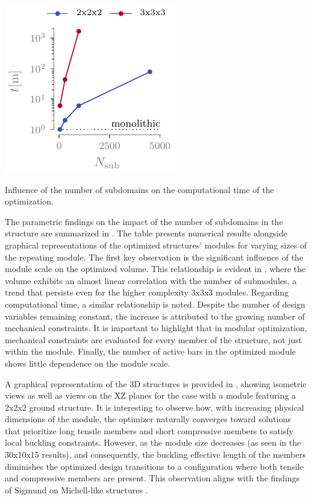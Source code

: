 \begin{marginfigure}
    \centering
    \includegraphics{figures/05_cellular_opt/00_module_scale_tab/scale_tab_t.pdf}
    \caption{Influence of the number of subdomains on the computational time of the optimization.}
    \label{fig:05_scale_t}
\end{marginfigure}

The parametric findings on the impact of the number of subdomains in the structure are summarized in . The table presents numerical results alongside graphical representations of the optimized structures' modules for varying sizes of the repeating module. The first key observation is the significant influence of the module scale on the optimized volume. This relationship is evident in , where the volume exhibits an almost linear correlation with the number of submodules, a trend that persists even for the higher complexity 3x3x3 modules. Regarding computational time, a similar relationship is noted. Despite the number of design variables remaining constant, the increase is attributed to the growing number of mechanical constraints. It is important to highlight that in modular optimization, mechanical constraints are evaluated for every member of the structure, not just within the module. Finally, the number of active bars in the optimized module shows little dependence on the module scale.

A graphical representation of the 3D structures is provided in , showing isometric views as well as views on the XZ planes for the case with a module featuring a 2x2x2 ground structure. It is interesting to observe how, with increasing physical dimensions of the module, the optimizer naturally converges toward solutions that prioritize long tensile members and short compressive members to satisfy local buckling constraints. However, as the module size decreases (as seen in the 30x10x15 results), and consequently, the buckling effective length of the members diminishes the optimized design transitions to a configuration where both tensile and compressive members are present. This observation aligns with the findings of Sigmund on Michell-like structures .

